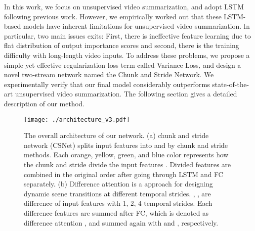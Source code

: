 \documentclass[letterpaper]{article} \usepackage{aaai19}  \usepackage{times}  \usepackage{helvet}  \usepackage{courier}  \usepackage{url}  \usepackage{graphicx}  \frenchspacing  \setlength{\pdfpagewidth}{8.5in}  \setlength{\pdfpageheight}{11in}
\begin{document}
In this work, we focus on unsupervised video summarization, and adopt LSTM following previous work. However, we empirically worked out that these LSTM-based models have inherent limitations for unsupervised video summarization. In particular, two main issues exits: First, there is ineffective feature learning due to flat distribution of output importance scores and second, there is the training difficulty with long-length video inputs. To address these problems, we propose a simple yet effective regularization loss term called Variance Loss, and design a novel two-stream network named the Chunk and Stride Network. We experimentally verify that our final model considerably outperforms state-of-the-art unsupervised video summarization. The following section gives a detailed description of our method.













































\begin{figure*}[t]
\centering
\texttt{[image: ./architecture\_v3.pdf]}
\caption{The overall architecture of our network. (a) chunk and stride network (CSNet) splits input features  into  and  by chunk and stride methods. Each orange, yellow, green, and blue color represents how the chunk and stride divide the input features . Divided features are combined in the original order after going through LSTM and FC separately. (b) Difference attention is a approach for designing dynamic scene transitions at different temporal strides. , ,  are difference of input features  with 1, 2, 4 temporal strides. Each difference features are summed after FC, which is denoted as difference attention , and summed again with  and , respectively.}
\label{fig:overview}
\end{figure*}
\end{document}
